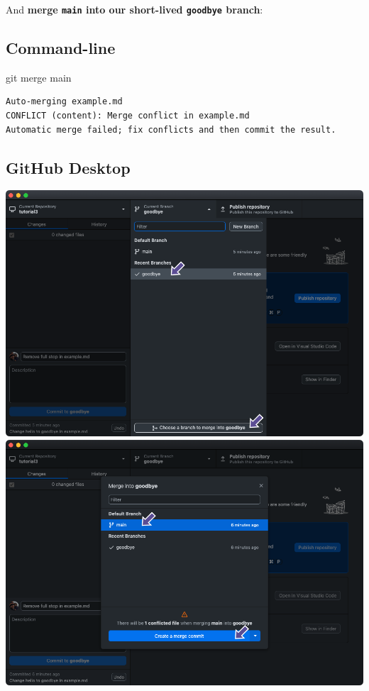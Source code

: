 \documentclass[
  letterpaper,
  DIV=11,
  numbers=noendperiod]{scrartcl}
\newenvironment{Shaded}{\begin{snugshade}}{\end{snugshade}}
\newcommand{\FunctionTok}[1]{\textcolor[rgb]{0.28,0.35,0.67}{#1}}
\newcommand{\NormalTok}[1]{\textcolor[rgb]{0.00,0.23,0.31}{#1}}
\begin{document}
And \textbf{merge \texttt{main} into our short-lived \texttt{goodbye}
branch}:

\subsection{Command-line}

\begin{Shaded}
\begin{Highlighting}[]
\FunctionTok{git}\NormalTok{ merge main}
\end{Highlighting}
\end{Shaded}

\begin{verbatim}
Auto-merging example.md
CONFLICT (content): Merge conflict in example.md
Automatic merge failed; fix conflicts and then commit the result.
\end{verbatim}

\subsection{GitHub Desktop}

\includegraphics{images/image66.png}
\includegraphics{images/image67.png}
\end{document}
